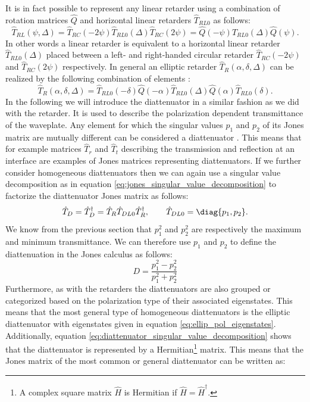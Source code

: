 It is in fact possible to represent any linear retarder using a combination of rotation matrices $\hat{Q}$ and horizontal linear retarders $\hat{T}_{RL0}$ as follows:
\begin{equation}
    \hat{T}_{RL}(\psi, \Delta)=\hat{T}_{RC}(-2\psi)\hat{T}_{RL0}(\Delta)\hat{T}_{RC}(2\psi)=
    \hat{Q}(-\psi)\hat{T}_{RL0}(\Delta)\hat{Q}(\psi).
\end{equation}
In other words a linear retarder is equivalent to a horizontal linear retarder $\hat{T}_{RL0}(\Delta)$ placed between a left- and right-handed circular retarder $\hat{T}_{RC}(-2\psi)$ and $\hat{T}_{RC}(2\psi)$ respectively. In general an elliptic retarder $\hat{T}_R(\alpha, \delta, \Delta)$ can be realized by the following combination of elements \cite{GilPerez2017}:
\begin{equation}
    \hat{T}_R(\alpha, \delta, \Delta)=
    \hat{T}_{RL0}(-\delta)\hat{Q}(-\alpha)\hat{T}_{RL0}(\Delta)\hat{Q}(\alpha)\hat{T}_{RL0}(\delta).
\end{equation}
In the following we will introduce the diattenuator in a similar fashion as we did with the retarder. It is used to describe the polarization dependent transmittance of the waveplate. Any element for which the singular values $p_1$ and $p_2$ of its Jones matrix are mutually different can be considered a diattenuator \cite{Savenkov2005}. This means that for example matrices $\hat{T}_r$ and $\hat{T}_t$ describing the transmission and reflection at an interface are examples of Jones matrices representing diattenuators. If we further consider homogeneous diattenuators then we can again use a singular value decomposition as in equation \ref{eq:jones_singular_value_decomposition} to factorize the diattenuator Jones matrix as follows:
\begin{equation}
    \label{eq:diattenuator_singular_value_decomposition}
    \hat{T}_D = \hat{T}_D^{\dagger} = \hat{T}_R\hat{T}_{DL0}\hat{T}_R^{\dagger}, 
    \qquad 
    \hat{T}_{DL0}=\diag{p_1, p_2}.
\end{equation}
We know from the previous section that $p_1^2$ and $p_2^2$ are respectively the maximum and minimum transmittance. We can therefore use $p_1$ and $p_2$ to define the diattenuation in the Jones calculus as follows: 
\begin{equation}
    \label{eq:diattenuation_1}
    D = \frac{p_1^2-p_2^2}{p_1^2+p_2^2}
\end{equation}
Furthermore, as with the retarders the diattenuators are also grouped or categorized based on the polarization type of their associated eigenstates. This means that the most general type of homogeneous diattenuators is the elliptic diattenuator with eigenstates given in equation \ref{eq:ellip_pol_eigenstates}. Additionally, equation \ref{eq:diattenuator_singular_value_decomposition} shows that the diattenuator is represented by a Hermitian\footnote{A complex square matrix $\hat{H}$ is Hermitian if $\hat{H}=\hat{H}^{\dagger}$.} matrix. This means that the Jones matrix of the most common or general diattenuator can be written as:
